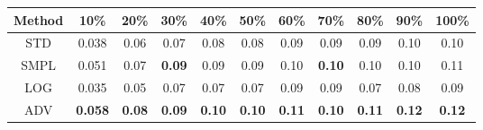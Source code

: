 \documentclass{standalone}
\begin{document}
\begin{tabular}{c|cccccccccc}
      \toprule
      Method & 10\% & 20\% & 30\% & 40\% & 50\% & 60\% & 70\% & 80\% & 90\% & 100\% \\
      \midrule
STD & 0.038 & 0.06 & 0.07 & 0.08 & 0.08 & 0.09 & 0.09 & 0.09 & 0.10 & 0.10\\
SMPL & 0.051 & 0.07 & \textbf{0.09} & 0.09 & 0.09 & 0.10 & \textbf{0.10} & 0.10 & 0.10 & 0.11\\
LOG & 0.035 & 0.05 & 0.07 & 0.07 & 0.07 & 0.09 & 0.09 & 0.07 & 0.08 & 0.09\\
ADV & \textbf{0.058} & \textbf{0.08} & \textbf{0.09} & \textbf{0.10} & \textbf{0.10} & \textbf{0.11} & \textbf{0.10} & \textbf{0.11} & \textbf{0.12} & \textbf{0.12}\\
  \bottomrule
\end{tabular}
\end{document}
